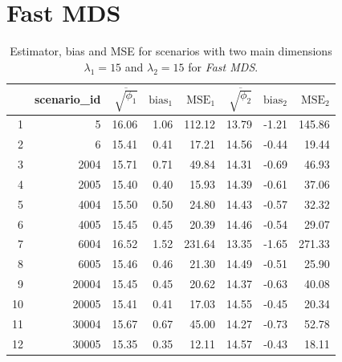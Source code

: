 \documentclass[11pt]{report}
\begin{document}
\section{Fast MDS}
\label{mse_fast}
\begin{table}[ht]
\centering
\begin{tabular}{rrrrrrrr}
 & scenario\_id & $\overline{\sqrt{\phi_1}}$ & $\mbox{bias}_1$ & $\mbox{MSE}_1$ & $\overline{\sqrt{\phi_2}}$ & $\mbox{bias}_2$ & $\mbox{MSE}_2$ \\ 
  \hline
  1 & 5 & 16.06 & 1.06 & 112.12 & 13.79 & -1.21 & 145.86 \\ 
  2 & 6 & 15.41 & 0.41 & 17.21 & 14.56 & -0.44 & 19.44 \\ 
  3 & 2004 & 15.71 & 0.71 & 49.84 & 14.31 & -0.69 & 46.93 \\ 
  4 & 2005 & 15.40 & 0.40 & 15.93 & 14.39 & -0.61 & 37.06 \\ 
  5 & 4004 & 15.50 & 0.50 & 24.80 & 14.43 & -0.57 & 32.32 \\ 
  6 & 4005 & 15.45 & 0.45 & 20.39 & 14.46 & -0.54 & 29.07 \\ 
  7 & 6004 & 16.52 & 1.52 & 231.64 & 13.35 & -1.65 & 271.33 \\ 
  8 & 6005 & 15.46 & 0.46 & 21.30 & 14.49 & -0.51 & 25.90 \\ 
  9 & 20004 & 15.45 & 0.45 & 20.62 & 14.37 & -0.63 & 40.08 \\ 
  10 & 20005 & 15.41 & 0.41 & 17.03 & 14.55 & -0.45 & 20.34 \\ 
  11 & 30004 & 15.67 & 0.67 & 45.00 & 14.27 & -0.73 & 52.78 \\ 
  12 & 30005 & 15.35 & 0.35 & 12.11 & 14.57 & -0.43 & 18.11 \\ 
   \hline
\end{tabular}
\caption{Estimator, bias and MSE for scenarios with two main dimensions $\lambda_1 = 15$ and $\lambda_2 = 15$ for \textit{Fast MDS}.}
\end{table}
\end{document}
